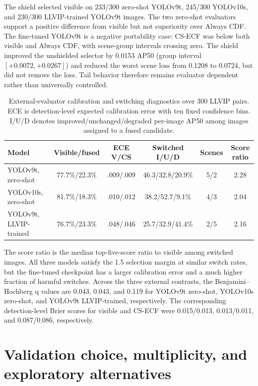 \documentclass[11pt]{article}
\begin{document}
The shield selected visible on 233/300 zero-shot YOLOv9t, 245/300 YOLOv10s,
and 230/300 LLVIP-trained YOLOv9t images. The two zero-shot evaluators support
a positive difference from visible but not superiority over Always CDF. The
fine-tuned YOLOv9t is a negative portability case: CS-ECF was below both
visible and Always CDF, with scene-group intervals crossing zero. The shield
improved the unshielded selector by 0.0153 AP50 (group interval
\([+0.0072,+0.0267]\)) and reduced the worst scene loss from 0.1208 to 0.0724,
but did not remove the loss. Tail behavior therefore remains evaluator
dependent rather than universally controlled.

\begin{table}[ht]
\centering
\scriptsize
\setlength{\tabcolsep}{3pt}
\caption{External-evaluator calibration and switching diagnostics over 300
LLVIP pairs. ECE is detection-level expected calibration error with ten fixed
confidence bins. I/U/D denotes improved/unchanged/degraded per-image AP50 among
images assigned to a fused candidate.}
\begin{tabular}{@{}lccccc@{}}
\toprule
Model & Visible/fused & ECE V/CS & Switched I/U/D & Scenes & Score ratio \\
\midrule
YOLOv9t, zero-shot & 77.7\%/22.3\% & .009/.009 &
46.3/32.8/20.9\% & 5/2 & 2.28 \\
YOLOv10s, zero-shot & 81.7\%/18.3\% & .010/.012 &
38.2/52.7/9.1\% & 4/3 & 2.04 \\
YOLOv9t, LLVIP-trained & 76.7\%/23.3\% & .048/.046 &
25.7/32.9/41.4\% & 2/5 & 2.16 \\
\bottomrule
\end{tabular}
\end{table}

The score ratio is the median top-five-score ratio to visible among switched
images. All three models satisfy the 1.5 selection margin at similar switch
rates, but the fine-tuned checkpoint has a larger calibration error and a much
higher fraction of harmful switches. Across the three external contrasts, the
Benjamini--Hochberg q values are 0.043, 0.043, and 0.119 for YOLOv9t
zero-shot, YOLOv10s zero-shot, and YOLOv9t LLVIP-trained, respectively.
The corresponding detection-level Brier scores for visible and CS-ECF were
0.015/0.013, 0.013/0.011, and 0.087/0.086, respectively.

\section{Validation choice, multiplicity, and exploratory alternatives}
\end{document}
